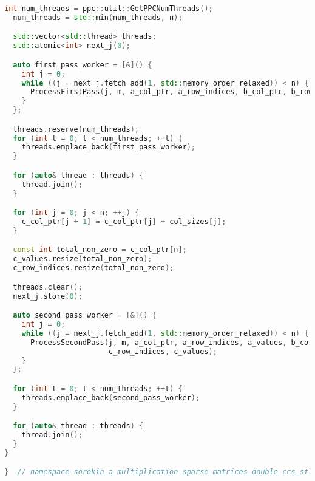 \documentclass[12pt]{article}
\begin{document}
\begin{lstlisting}[language=C++]
  int num_threads = ppc::util::GetPPCNumThreads();
  num_threads = std::min(num_threads, n);

  std::vector<std::thread> threads;
  std::atomic<int> next_j(0);

  auto first_pass_worker = [&]() {
    int j = 0;
    while ((j = next_j.fetch_add(1, std::memory_order_relaxed)) < n) {
      ProcessFirstPass(j, m, a_col_ptr, a_row_indices, b_col_ptr, b_row_indices, col_sizes);
    }
  };

  threads.reserve(num_threads);
  for (int t = 0; t < num_threads; ++t) {
    threads.emplace_back(first_pass_worker);
  }

  for (auto& thread : threads) {
    thread.join();
  }

  for (int j = 0; j < n; ++j) {
    c_col_ptr[j + 1] = c_col_ptr[j] + col_sizes[j];
  }

  const int total_non_zero = c_col_ptr[n];
  c_values.resize(total_non_zero);
  c_row_indices.resize(total_non_zero);

  threads.clear();
  next_j.store(0);

  auto second_pass_worker = [&]() {
    int j = 0;
    while ((j = next_j.fetch_add(1, std::memory_order_relaxed)) < n) {
      ProcessSecondPass(j, m, a_col_ptr, a_row_indices, a_values, b_col_ptr, b_row_indices, b_values, c_col_ptr,
                        c_row_indices, c_values);
    }
  };

  for (int t = 0; t < num_threads; ++t) {
    threads.emplace_back(second_pass_worker);
  }

  for (auto& thread : threads) {
    thread.join();
  }
}

}  // namespace sorokin_a_multiplication_sparse_matrices_double_ccs_stl
\end{lstlisting}
\end{document}
